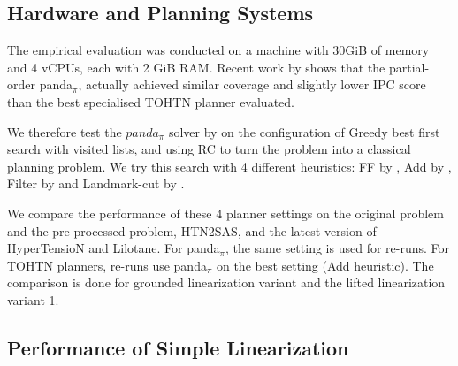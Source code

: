 \documentclass[letterpaper]{article}
\begin{document}
\subsection{Hardware and Planning Systems}
The empirical evaluation was conducted on a machine with 30GiB of memory and 4 vCPUs, each with 2 GiB RAM. Recent work by \cite{HTN2SAS} shows that the partial-order panda$_\pi$, actually achieved similar coverage and slightly lower IPC score than the best specialised TOHTN planner evaluated. %

We therefore test the $panda_{\pi}$ solver by \cite{useClassicalHuristicICAPS18,useClassicalHeuristicIJCAI19,progressionsearchJAIR20} on the configuration of Greedy best first search with visited lists, and using RC to turn the problem into a classical planning problem. We try this search with 4 different heuristics: FF by \cite{FF}, Add by \cite{Add}, Filter by \cite{useClassicalHuristicICAPS18} and Landmark-cut by \cite{LM-Cut}.

We compare the performance of these 4 planner settings on the original problem and the pre-processed problem, HTN2SAS, and the latest version of HyperTensioN and Lilotane. For panda$_{\pi}$, the same setting is used for re-runs. For TOHTN planners, re-runs use panda$_{\pi}$ on the best setting (Add heuristic). The comparison is done for grounded linearization variant and the lifted linearization variant 1.

\subsection{Performance of Simple Linearization}
\end{document}
